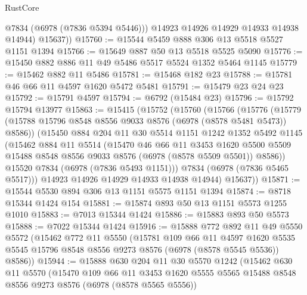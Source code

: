 \begin{lexlean}{RustCore}
\begin{coremodule}
            @7834
            (@6978 (@7836 @5394 @5446)))
          @14923
          @14926
          @14929
          @14933
          @14938
          @14944)
        @15637))
@15760 := @15544 @5459 @888 @306 @13 @5518 @5527 @1151 @1394
@15766 := @15649 @887 @50 @13 @5518 @5525 @5090
@15776 := @15450 @882 @886 @11 @49 @5486 @5517 @5524 @1352 @5464 @1145
@15779 := @15462 @882 @11 @5486
@15781 := @15468 @182 @23
@15788 := @15781 @46 @66 @11 @4597 @1620 @5472 @5481
@15791 := @15479 @23 @24 @23
@15792 := @15791 @4597
@15794 := @6792 (@15484 @23)
@15796 := @15792 @15794 @13977
@15863 := @15415
    (@15752
      (@15760
        (@15766
          (@15776
            (@15779 (@15788 @15796 @8548 @8556 @9033 @8576 (@6978 (@8578 @5481 @5473)) @8586))
            (@15450
              @884
              @204
              @11
              @30
              @5514
              @1151
              @1242
              @1352
              @5492
              @1145
              (@15462
                @884
                @11
                @5514
                (@15470
                  @46
                  @66
                  @11
                  @3453
                  @1620
                  @5500
                  @5509
                  @15488
                  @8548
                  @8556
                  @9033
                  @8576
                  (@6978 (@8578 @5509 @5501))
                  @8586))
              @15520
              @7834
              (@6978 (@7836 @5493 @1151)))
            @7834
            (@6978 (@7836 @5465 @5517)))
          @14923
          @14926
          @14929
          @14933
          @14938
          @14944)
        @15637))
@15871 := @15544 @5530 @894 @306 @13 @1151 @5575 @1151 @1394
@15874 := @8718 @15344 @1424 @154
@15881 := @15874 @893 @50 @13 @1151 @5573 @1255 @1010
@15883 := @7013 @15344 @1424
@15886 := @15883 @893 @50 @5573
@15888 := @7022 @15344 @1424
@15916 := @15888
    @772
    @892
    @11
    @49
    @5550
    @5572
    (@15462
      @772
      @11
      @5550
      (@15781
        @109
        @66
        @11
        @4597
        @1620
        @5535
        @5545
        @15796
        @8548
        @8556
        @9273
        @8576
        (@6978 (@8578 @5545 @5536))
        @8586))
@15944 := @15888
    @630
    @204
    @11
    @30
    @5570
    @1242
    (@15462
      @630
      @11
      @5570
      (@15470
        @109
        @66
        @11
        @3453
        @1620
        @5555
        @5565
        @15488
        @8548
        @8556
        @9273
        @8576
        (@6978 (@8578 @5565 @5556))

\end{coremodule}
\end{lexlean}
